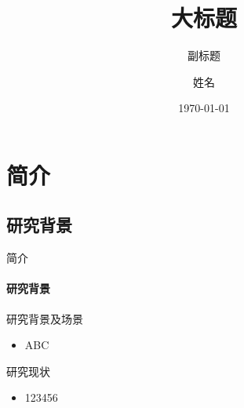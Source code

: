 \documentclass[10pt,aspectratio=169,]{beamer}
\title{大标题}
\subtitle{副标题}
\author[Carpenter Cheung]{姓名}
\institute[Nanjing normal university]{指导老师: xxx老师\\强化培养学院\\南京师范大学}
\date{\today}
\begin{document}
\maketitle


\section{简介}
\subsection{研究背景}
\begin{frame}[c]{简介}
	\framesubtitle{研究背景}
\begin{block}{研究背景及场景}
\begin{itemize}
	\item ABC
\end{itemize}
\end{block}

\begin{block}{研究现状}
	\begin{itemize}
	\item 123456
	\end{itemize}
\end{block}
\end{frame}	

%
\end{document}
